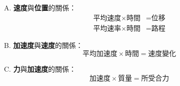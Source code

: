 \documentclass[12pt]{article}
\begin{document}
\begin{problem}
  \item[A.] \textbf{速度}與\textbf{位置}的關係：
  \begin{align*}
    \textrm{平均速度} \times \textrm{時間} &= \textrm{位移} \\
    \textrm{平均速率} \times \textrm{時間} &= \textrm{路程}
  \end{align*}
  \item[B.] \textbf{加速度}與\textbf{速度}的關係：
  \begin{equation*}
    \textrm{平均加速度} \times \textrm{時間} = \textrm{速度變化}
  \end{equation*}
  \item[C.] \textbf{力}與\textbf{加速度}的關係：
  \begin{equation*}
    \textrm{加速度} \times \textrm{質量} = \textrm{所受合力}
  \end{equation*}
\end{problem}
\end{document}
